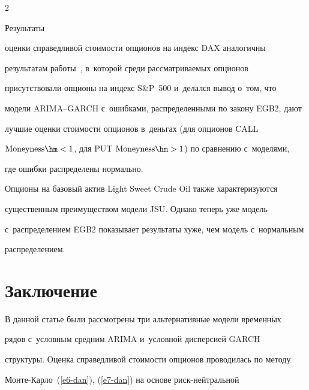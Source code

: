 \begin{multicols}{2}





Результаты 


оценки спра\-вед\-ли\-вой стои\-мости опционов на индекс DAX аналогичны 


результатам работы~\cite{7-dan}, в~которой среди рас\-смат\-ри\-ва\-емых опционов 


присутствовали опционы на индекс S\&P~500 и~делался вывод о~том, что 


модели ARIMA--GARCH с~ошибками, распределенными по закону EGB2, дают 


лучшие оценки стоимости опционов в~деньгах (для опционов CALL 


$\mathrm{Moneyness}\hm< 1$, для PUT $\mathrm{Moneyness}\hm>1$) по сравнению с~моделями, 


где ошибки распределены нормально. 


  


  Опционы на базовый актив Light Sweet Crude Oil также характеризуются 


существенным преимуществом модели JSU. Однако теперь уже модель 


с~распределением EGB2 показывает результаты хуже, чем модель с~нормальным 


распределением.


  


\vspace*{-7pt}





\section{Заключение}


\vspace*{-2pt}





  В данной статье были рассмотрены три альтернативные модели временн$\acute{\mbox{ы}}$х 


рядов с~условным средним ARIMA и~условной дисперсией GARCH 


структуры. Оценка справедливой стоимости опционов проводилась по методу  


Мон\-те-Кар\-ло~(\ref{e6-dan}), (\ref{e7-dan}) на основе риск-ней\-т\-раль\-ной 



\end{multicols}
